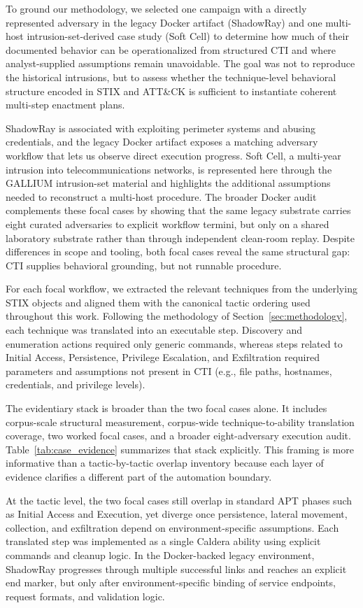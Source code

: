 \documentclass[sigconf]{acmart}
\newcommand{\stix}{STIX\xspace}
\newcommand{\attack}{ATT\&CK\xspace}
\newcommand{\caldera}{Caldera\xspace}
\begin{document}
To ground our methodology, we selected one campaign with a directly represented adversary in the legacy Docker artifact (ShadowRay) and one multi-host intrusion-set-derived case study (Soft Cell) to determine how much of their documented behavior can be operationalized from structured CTI and where analyst-supplied assumptions remain unavoidable. The goal was not to reproduce the historical intrusions, but to assess whether the technique-level behavioral structure encoded in \stix{} and \attack{} is sufficient to instantiate coherent multi-step enactment plans.

ShadowRay is associated with exploiting perimeter systems and abusing credentials, and the legacy Docker artifact exposes a matching adversary workflow that lets us observe direct execution progress. Soft Cell, a multi-year intrusion into telecommunications networks, is represented here through the GALLIUM intrusion-set material and highlights the additional assumptions needed to reconstruct a multi-host procedure. The broader Docker audit complements these focal cases by showing that the same legacy substrate carries eight curated adversaries to explicit workflow termini, but only on a shared laboratory substrate rather than through independent clean-room replay. Despite differences in scope and tooling, both focal cases reveal the same structural gap: CTI supplies behavioral grounding, but not runnable procedure.

For each focal workflow, we extracted the relevant techniques from the underlying \stix{} objects and aligned them with the canonical tactic ordering used throughout this work. Following the methodology of Section~\ref{sec:methodology}, each technique was translated into an executable step. Discovery and enumeration actions required only generic commands, whereas steps related to Initial Access, Persistence, Privilege Escalation, and Exfiltration required parameters and assumptions not present in CTI (e.g., file paths, hostnames, credentials, and privilege levels).

The evidentiary stack is broader than the two focal cases alone. It includes corpus-scale structural measurement, corpus-wide technique-to-ability translation coverage, two worked focal cases, and a broader eight-adversary execution audit. Table~\ref{tab:case_evidence} summarizes that stack explicitly. This framing is more informative than a tactic-by-tactic overlap inventory because each layer of evidence clarifies a different part of the automation boundary.

At the tactic level, the two focal cases still overlap in standard APT phases such as Initial Access and Execution, yet diverge once persistence, lateral movement, collection, and exfiltration depend on environment-specific assumptions. Each translated step was implemented as a single \caldera{} ability using explicit commands and cleanup logic. In the Docker-backed legacy environment, ShadowRay progresses through multiple successful links and reaches an explicit end marker, but only after environment-specific binding of service endpoints, request formats, and validation logic.
\end{document}
